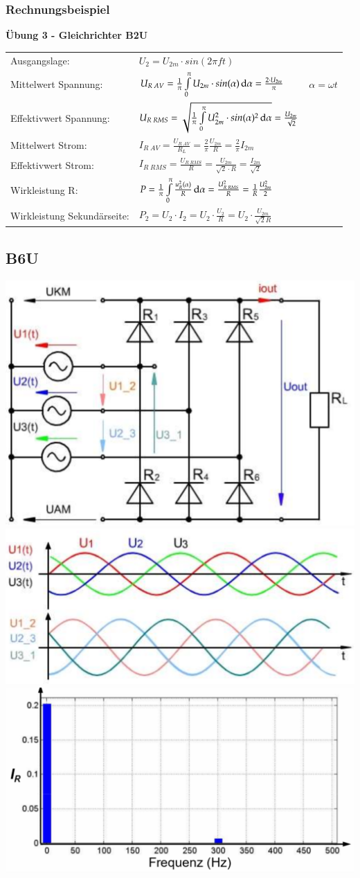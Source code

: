 \subsubsection{Rechnungsbeispiel}
\textbf{Übung 3 - Gleichrichter B2U}\newline
\renewcommand{\arraystretch}{2}
\begin{tabular}{ p{}  p{}  p{}}
    Ausgangslage:&
    $ U_2= U_{2m}\cdot sin(2\pi ft)$&
    \\
    Mittelwert Spannung: &
    $ U_{R \; AV}= \frac{1}{\pi} \int\limits_{0}^{\pi} U_{2m}\cdot sin(\alpha)\mathop{}\!\mathrm{d}\alpha=\frac{2\cdot U_{2m}}{\pi} $ &
    $ \alpha=\omega t $
    \\
    
    Effektivwert Spannung:   &
    $ U_{R \; RMS}= \sqrt{\frac{1}{\pi}\int\limits_{0}^{\pi} U_{2m}^2\cdot sin(\alpha)^2\mathop{}\!\mathrm{d}\alpha} = \frac{U_{2m}}{\sqrt{2}} $ &
    \\ 
    
    Mittelwert Strom: &
    $ I_{R \; AV}=\frac{U_{R \; AV}}{R_L}= \frac{2}{\pi}\frac{U_{2m}}{R}= \frac{2}{\pi} I_{2m} $ &
    \\
    
    Effektivwert Strom: &
    $ I_{R \; RMS}=\frac{U_{R \; RMS}}{R}= \frac{U_{2m}}{\sqrt{2}\cdot R}= \frac{I_{2m}}{\sqrt{2}} $ &
    \\
    
    Wirkleistung R: &
    $ P= \frac{1}{\pi}\int\limits_{0}^{\pi}\frac{u_R^2(\alpha)}{R}\mathop{}\!\mathrm{d} \alpha = \frac{U_{R \; RMS}^2}{R}=\frac{1}{R}\frac{U_{2m}^2}{2} $&
    \\
    Wirkleistung Sekundärseite: &
    $P_2=U_2\cdot I_2=U_2\cdot \frac{U_2}{R}=U_2\cdot \frac{U_{2m}}{\sqrt{2}R}$&
    \\
\end{tabular}
\renewcommand{\arraystretch}{1}


\subsection{B6U}
\includegraphics[width=0.3\linewidth]{images/PrakUGB6}
\includegraphics[width=0.3\linewidth]{images/PrakUGB6Kl1}
\includegraphics[width=0.3\linewidth]{images/UGB6OW}\newline
\clearpage